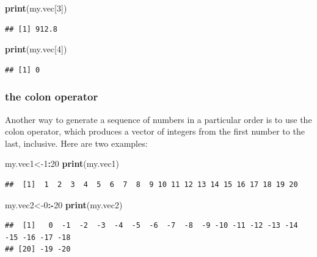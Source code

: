 \documentclass[
]{book}
\newenvironment{Shaded}{\begin{snugshade}}{\end{snugshade}}
\newcommand{\DecValTok}[1]{\textcolor[rgb]{0.00,0.00,0.81}{#1}}
\newcommand{\KeywordTok}[1]{\textcolor[rgb]{0.13,0.29,0.53}{\textbf{#1}}}
\newcommand{\NormalTok}[1]{#1}
\newcommand{\OperatorTok}[1]{\textcolor[rgb]{0.81,0.36,0.00}{\textbf{#1}}}
\begin{document}
\begin{Shaded}
\begin{Highlighting}[]
\KeywordTok{print}\NormalTok{(my.vec[}\DecValTok{3}\NormalTok{])}
\end{Highlighting}
\end{Shaded}

\begin{verbatim}
## [1] 912.8
\end{verbatim}

\begin{Shaded}
\begin{Highlighting}[]
\KeywordTok{print}\NormalTok{(my.vec[}\DecValTok{4}\NormalTok{])}
\end{Highlighting}
\end{Shaded}

\begin{verbatim}
## [1] 0
\end{verbatim}

\hypertarget{the-colon-operator}{%
\subsubsection{the colon operator}\label{the-colon-operator}}

Another way to generate a sequence of numbers in a particular order is to use the colon operator, which produces a vector of integers from the first number to the last, inclusive. Here are two examples:

\begin{Shaded}
\begin{Highlighting}[]
\NormalTok{my.vec1\textless{}{-}}\DecValTok{1}\OperatorTok{:}\DecValTok{20}
\KeywordTok{print}\NormalTok{(my.vec1)}
\end{Highlighting}
\end{Shaded}

\begin{verbatim}
##  [1]  1  2  3  4  5  6  7  8  9 10 11 12 13 14 15 16 17 18 19 20
\end{verbatim}

\begin{Shaded}
\begin{Highlighting}[]
\NormalTok{my.vec2\textless{}{-}}\DecValTok{0}\OperatorTok{:{-}}\DecValTok{20}
\KeywordTok{print}\NormalTok{(my.vec2)}
\end{Highlighting}
\end{Shaded}

\begin{verbatim}
##  [1]   0  -1  -2  -3  -4  -5  -6  -7  -8  -9 -10 -11 -12 -13 -14 -15 -16 -17 -18
## [20] -19 -20
\end{verbatim}
\end{document}
